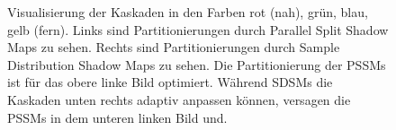 \documentclass[runningheaders,a4paper]{llncs}
\begin{document}
\begin{figure}
	\centering
	
	
	\caption{
		Visualisierung der Kaskaden in den Farben rot (nah), grün, blau, gelb (fern).
		Links sind Partitionierungen durch Parallel Split Shadow Maps zu sehen.
		Rechts sind Partitionierungen durch Sample Distribution Shadow Maps zu sehen.
		Die Partitionierung der PSSMs ist für das obere linke Bild optimiert.
		Während SDSMs die Kaskaden unten rechts adaptiv anpassen können, versagen die PSSMs in dem unteren linken Bild und.
	}
\end{figure}
\end{document}
